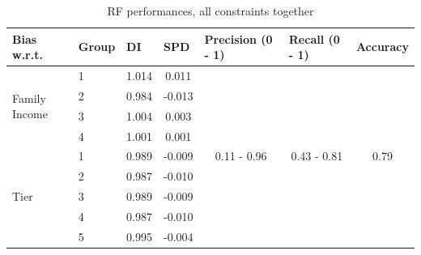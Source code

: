 \documentclass{article}
\begin{document}
\begin{table}[H]
\caption{RF performances, all constraints together}
\begin{tabular}{llcc|ccc}
\hline
\textbf{Bias w.r.t.}                   &  \textbf{Group} & \multicolumn{1}{l}{ \textbf{DI} } & \multicolumn{1}{l}{ \textbf{SPD}}    & \multicolumn{1}{l}{ \textbf{Precision (0 - 1)}} & \multicolumn{1}{l}{\textbf{Recall (0 - 1)}} & \multicolumn{1}{l}{\textbf{Accuracy}} \\
\hline
\multirow{4}{*}{Family Income} & 1     & 1.014                  & 0.011                      & \multirow{13}{*}{0.11 - 0.96}         & \multirow{13}{*}{0.43 - 0.81}      & \multirow{13}{*}{0.79}       \\
                               & 2     & 0.984                  & -0.013                     &                                       &                                    &                              \\
                               & 3     & 1.004                  & 0.003                      &                                       &                                    &                              \\
                               & 4     & 1.001                  & 0.001                      &                                       &                                    &                              \\
\cline{1-4}
\multirow{5}{*}{Tier}          & 1     & 0.989                  & -0.009                     &                                       &                                    &                              \\
                               & 2     & 0.987                  & -0.010                     &                                       &                                    &                              \\
                               & 3     & 0.989                  & -0.009                     &                                       &                                    &                              \\
                               & 4     & 0.987                  & -0.010                     &                                       &                                    &                              \\
                               & 5     & 0.995                  & -0.004                     &                                       &                                    &                              \\

\end{tabular}
\end{table}
\end{document}
